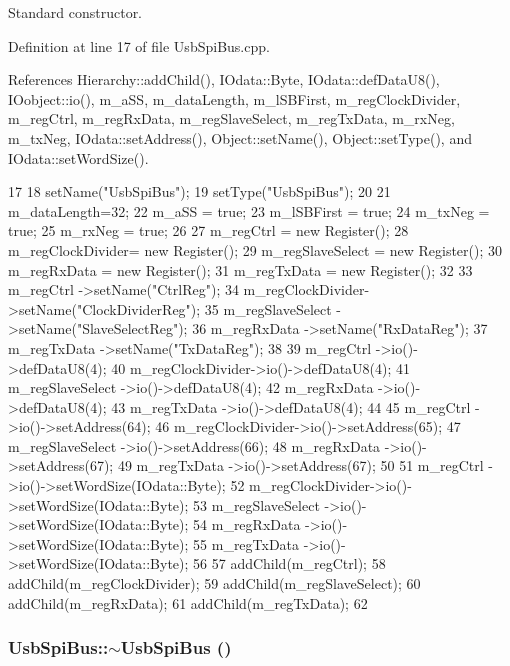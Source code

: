 Standard constructor. 

Definition at line 17 of file UsbSpiBus.cpp.

References Hierarchy::addChild(), IOdata::Byte, IOdata::defDataU8(), IOobject::io(), m\_\-aSS, m\_\-dataLength, m\_\-lSBFirst, m\_\-regClockDivider, m\_\-regCtrl, m\_\-regRxData, m\_\-regSlaveSelect, m\_\-regTxData, m\_\-rxNeg, m\_\-txNeg, IOdata::setAddress(), Object::setName(), Object::setType(), and IOdata::setWordSize().


\begin{DoxyCode}
17                        {
18   setName("UsbSpiBus");
19   setType("UsbSpiBus");
20   
21   m_dataLength=32;
22   m_aSS      = true;
23   m_lSBFirst = true;
24   m_txNeg    = true;
25   m_rxNeg    = true;
26 
27   m_regCtrl        = new Register();
28   m_regClockDivider= new Register();
29   m_regSlaveSelect = new Register();
30   m_regRxData      = new Register();
31   m_regTxData      = new Register();
32 
33   m_regCtrl        ->setName("CtrlReg");
34   m_regClockDivider->setName("ClockDividerReg");
35   m_regSlaveSelect ->setName("SlaveSelectReg");
36   m_regRxData      ->setName("RxDataReg");
37   m_regTxData      ->setName("TxDataReg");
38 
39   m_regCtrl        ->io()->defDataU8(4);
40   m_regClockDivider->io()->defDataU8(4);
41   m_regSlaveSelect ->io()->defDataU8(4);
42   m_regRxData      ->io()->defDataU8(4);
43   m_regTxData      ->io()->defDataU8(4);
44 
45   m_regCtrl        ->io()->setAddress(64);
46   m_regClockDivider->io()->setAddress(65);
47   m_regSlaveSelect ->io()->setAddress(66);
48   m_regRxData      ->io()->setAddress(67);
49   m_regTxData      ->io()->setAddress(67);
50 
51   m_regCtrl        ->io()->setWordSize(IOdata::Byte);
52   m_regClockDivider->io()->setWordSize(IOdata::Byte);
53   m_regSlaveSelect ->io()->setWordSize(IOdata::Byte);
54   m_regRxData      ->io()->setWordSize(IOdata::Byte);
55   m_regTxData      ->io()->setWordSize(IOdata::Byte);
56   
57   addChild(m_regCtrl);
58   addChild(m_regClockDivider);
59   addChild(m_regSlaveSelect);
60   addChild(m_regRxData);
61   addChild(m_regTxData);
62 }
\end{DoxyCode}
\hypertarget{classUsbSpiBus_abeabcef3ac01134582fe275c89b9922f}{
\subsubsection[{$\sim$UsbSpiBus}]{\setlength{\rightskip}{0pt plus 5cm}UsbSpiBus::$\sim$UsbSpiBus ()}}
\label{classUsbSpiBus_abeabcef3ac01134582fe275c89b9922f}


